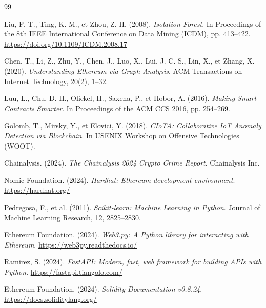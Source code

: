 \documentclass[12pt,a4paper]{report}
\begin{document}
\begin{thebibliography}{99}

Liu, F. T., Ting, K. M., et Zhou, Z. H. (2008).
\textit{Isolation Forest}.
In Proceedings of the 8th IEEE International Conference on Data Mining (ICDM), pp. 413--422.
\url{https://doi.org/10.1109/ICDM.2008.17}

Chen, T., Li, Z., Zhu, Y., Chen, J., Luo, X., Lui, J. C. S., Lin, X., et Zhang, X. (2020).
\textit{Understanding Ethereum via Graph Analysis}.
ACM Transactions on Internet Technology, 20(2), 1--32.

Luu, L., Chu, D. H., Olickel, H., Saxena, P., et Hobor, A. (2016).
\textit{Making Smart Contracts Smarter}.
In Proceedings of the ACM CCS 2016, pp. 254--269.

Golomb, T., Mirsky, Y., et Elovici, Y. (2018).
\textit{CIoTA: Collaborative IoT Anomaly Detection via Blockchain}.
In USENIX Workshop on Offensive Technologies (WOOT).

Chainalysis. (2024).
\textit{The Chainalysis 2024 Crypto Crime Report}.
Chainalysis Inc.

Nomic Foundation. (2024).
\textit{Hardhat: Ethereum development environment}.
\url{https://hardhat.org/}

Pedregosa, F., et al. (2011).
\textit{Scikit-learn: Machine Learning in Python}.
Journal of Machine Learning Research, 12, 2825--2830.

Ethereum Foundation. (2024).
\textit{Web3.py: A Python library for interacting with Ethereum}.
\url{https://web3py.readthedocs.io/}

Ramirez, S. (2024).
\textit{FastAPI: Modern, fast, web framework for building APIs with Python}.
\url{https://fastapi.tiangolo.com/}

Ethereum Foundation. (2024).
\textit{Solidity Documentation v0.8.24}.
\url{https://docs.soliditylang.org/}

\end{thebibliography}
\end{document}
